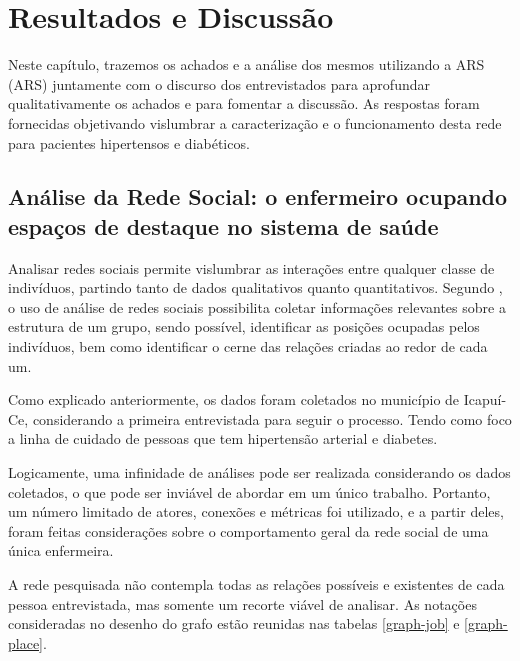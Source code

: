 \chapter{Resultados e Discussão}
\label{chap:resultados}

Neste capítulo, trazemos os achados e a análise dos mesmos utilizando a \acrlong{ARS} (\acrshort{ARS}) juntamente com o discurso dos entrevistados para aprofundar qualitativamente os achados e para fomentar a discussão.  As respostas foram fornecidas objetivando vislumbrar a caracterização e o funcionamento desta rede para pacientes hipertensos e diabéticos. 

\section{Análise da Rede Social: o enfermeiro ocupando espaços de destaque no sistema de saúde}

Analisar redes sociais permite vislumbrar as interações entre qualquer classe de indivíduos, partindo tanto de dados qualitativos quanto quantitativos. Segundo \cite{stanley1994social},  o uso de  análise de redes sociais possibilita coletar informações relevantes sobre a estrutura de um grupo, sendo possível, identificar as posições ocupadas pelos indivíduos, bem como identificar o cerne das relações criadas ao redor de cada um.

Como explicado anteriormente, os dados foram coletados no município de Icapuí-Ce, considerando a primeira entrevistada para seguir o processo. Tendo como foco a linha de cuidado de pessoas que tem hipertensão arterial e diabetes. 

Logicamente, uma infinidade de análises pode ser realizada considerando os dados coletados, o que pode ser inviável de abordar em um único trabalho. Portanto, um número limitado de atores, conexões e métricas foi utilizado, e a partir deles, foram feitas considerações sobre o comportamento geral da rede social de uma única enfermeira. 

A rede pesquisada não contempla todas as relações possíveis e existentes de cada pessoa entrevistada, mas somente um recorte viável de analisar. As notações consideradas no desenho do grafo estão reunidas nas tabelas \ref{graph-job} e \ref{graph-place}.

